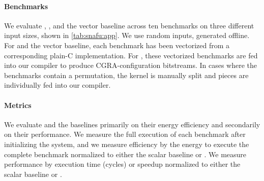 \paragraph{Benchmarks}
We evaluate \snafuarch, \manic, and the vector baseline across ten benchmarks on three different input sizes, shown in \autoref{tab:snafu:app}.
%
We use random inputs, generated offline. 
% 
For \manic and the vector baseline, each benchmark has been vectorized from a corresponding plain-C implementation.
% 
For \snafuarch, these vectorized benchmarks are fed into our compiler to produce CGRA-configuration bitstreams.
% 
In cases where the benchmarks contain a permutation, the kernel is manually split and pieces are individually fed into our compiler.

\paragraph{Metrics}
%
We evaluate \snafuarch and the baselines primarily on their energy efficiency
and secondarily on their performance.
%
We measure the full execution of each benchmark after initializing the system, and we measure efficiency by the energy to execute the complete benchmark normalized to either the scalar baseline or \snafuarch.
%
We measure performance by execution time (cycles) or speedup normalized to either the scalar baseline or \snafuarch.
